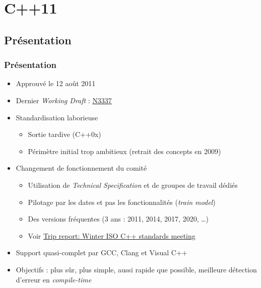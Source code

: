 \documentclass[C++.tex]{subfiles}
\begin{document}
\section{C++11}
\subsection*{Présentation}
\begin{frame}
	\frametitle{Présentation}
	\begin{itemize}
		\item Approuvé le 12 août 2011
		\item Dernier \textit{Working Draft} : \href{http://www.open-std.org/jtc1/sc22/wg21/docs/papers/2012/n3337.pdf}{N3337}
		\item Standardisation laborieuse
		\begin{itemize}
			\item Sortie tardive (C++0x)
			\item Périmètre initial trop ambitieux (retrait des concepts en 2009)
		\end{itemize}
		\item Changement de fonctionnement du comité
		\begin{itemize}
			\item Utilisation de \textit{Technical Specification} et de groupes de travail dédiés
			\item Pilotage par les dates et pas les fonctionnalités (\textit{train model})
			\item Des versions fréquentes (3 ans : 2011, 2014, 2017, 2020, \ldots)
			\item Voir \href{https://herbsutter.com/2016/03/11/trip-report-winter-iso-c-standards-meeting/}{Trip report: Winter ISO C++ standards meeting}
		\end{itemize}
		\item Support quasi-complet par GCC, Clang et Visual C++


		\item Objectifs : plus sûr, plus simple, aussi rapide que possible, meilleure détection d'erreur en \textit{compile-time}

	\end{itemize}
\end{frame}
\end{document}
